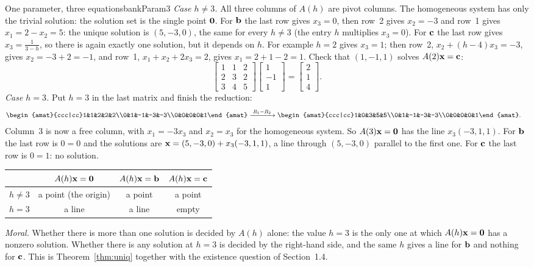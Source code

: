 \documentclass[11pt]{article}
\begin{document}
\begin{exmp}{One parameter, three equations}{bankParam3}
\emph{Case $h\neq3$.} All three columns of $A(h)$ are pivot columns. The homogeneous system has only the trivial solution: the solution set is the single point $\mathbf{0}$. For $\mathbf{b}$ the last row gives $x_3=0$, then row~2 gives $x_2=-3$ and row~1 gives $x_1=2-x_2=5$: the unique solution is $(5,-3,0)$, the same for every $h\neq3$ (the entry $h$ multiplies $x_3=0$). For $\mathbf{c}$ the last row gives $x_3=\frac{1}{3-h}$, so there is again exactly one solution, but it depends on $h$. For example $h=2$ gives $x_3=1$; then row~2, $x_2+(h-4)x_3=-3$, gives $x_2=-3+2=-1$, and row~1, $x_1+x_2+2x_3=2$, gives $x_1=2+1-2=1$. Check that $(1,-1,1)$ solves $A(2)\mathbf{x}=\mathbf{c}$:
\[
\begin{bmatrix}1&1&2\\2&3&2\\3&4&5\end{bmatrix}\begin{bmatrix}1\\-1\\1\end{bmatrix}=\begin{bmatrix}2\\1\\4\end{bmatrix}.
\]
\emph{Case $h=3$.} Put $h=3$ in the last matrix and finish the reduction:
\begin{align*}
&\begin{amat}{ccc|cc}1&1&2&2&2\\0&1&-1&-3&-3\\0&0&0&0&1\end{amat}
\rops{R_1-R_2}
\begin{amat}{ccc|cc}1&0&3&5&5\\0&1&-1&-3&-3\\0&0&0&0&1\end{amat}.
\end{align*}
Column~3 is now a free column, with $x_1=-3x_3$ and $x_2=x_3$ for the homogeneous system. So $A(3)\mathbf{x}=\mathbf{0}$ has the line $x_3(-3,1,1)$. For $\mathbf{b}$ the last row is $0=0$ and the solutions are $\mathbf{x}=(5,-3,0)+x_3(-3,1,1)$, a line through $(5,-3,0)$ parallel to the first one. For $\mathbf{c}$ the last row is $0=1$: no solution.

\begin{center}
\begin{tabular}{lccc}\toprule
 & $A(h)\mathbf{x}=\mathbf{0}$ & $A(h)\mathbf{x}=\mathbf{b}$ & $A(h)\mathbf{x}=\mathbf{c}$\\\midrule
$h\neq3$ & a point (the origin) & a point & a point\\
$h=3$ & a line & a line & empty\\\bottomrule
\end{tabular}
\end{center}
\emph{Moral.} Whether there is more than one solution is decided by $A(h)$ alone: the value $h=3$ is the only one at which $A(h)\mathbf{x}=\mathbf{0}$ has a nonzero solution. Whether there is any solution at $h=3$ is decided by the right-hand side, and the same $h$ gives a line for $\mathbf{b}$ and nothing for $\mathbf{c}$. This is Theorem~\ref{thm:uniq} together with the existence question of Section~1.4.
\end{exmp}
\end{document}
